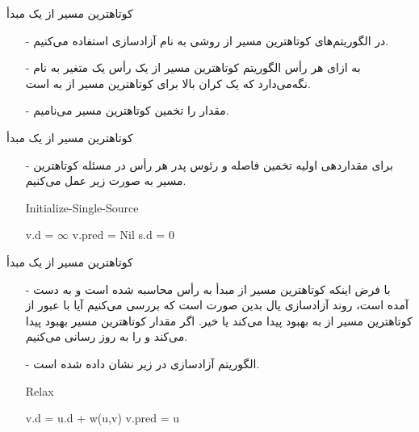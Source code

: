 \begin{frame}{‌کوتاهترین مسیر از یک مبدأ}
\begin{itemize}\itemr
\item[-]
در الگوریتم‌های کوتاهترین مسیر از روشی به نام آزادسازی
استفاده می‌کنیم.
\item[-]
به ازای هر رأس
الگوریتم کوتاهترین مسیر از یک رأس
یک متغیر به نام
نگه‌می‌دارد که یک کران بالا برای کوتاهترین مسیر از
به
است.
\item[-]
مقدار
را تخمین کوتاهترین مسیر
می‌نامیم.
\end{itemize}
\end{frame}


\begin{frame}{‌کوتاهترین مسیر از یک مبدأ}
\begin{itemize}\itemr
\item[-]
برای مقداردهی اولیه تخمین فاصله و رئوس پدر هر رأس در مسئله کوتاهترین مسیر به صورت زیر عمل می‌کنیم.
\begin{algorithm}[H]\alglr
  \caption{Initialize-Single-Source} 
  \begin{algorithmic}[1]
   			\State v.d = $\infty$
   			\State v.pred = Nil
   	\EndFor
   	\State s.d = 0   
  \end{algorithmic}
  \label{alg:merge}
\end{algorithm}
\end{itemize}
\end{frame}


\begin{frame}{‌کوتاهترین مسیر از یک مبدأ}
\begin{itemize}\itemr
\item[-]
با فرض اینکه کوتاهترین مسیر از مبدأ 
 به رأس
محاسبه شده است و 
به دست آمده است،
روند آزادسازی یال
بدین صورت است که بررسی می‌کنیم آیا با عبور از
کوتاهترین مسیر از
به
بهبود پیدا می‌کند یا خیر. اگر مقدار کوتاهترین مسیر بهبود پیدا می‌کند
و
را به روز رسانی می‌کنیم.
\item[-]
الگوریتم آزادسازی در زیر نشان داده شده است.
\begin{algorithm}[H]\alglr
  \caption{Relax} 
  \begin{algorithmic}[1]
   			\State v.d = u.d + w(u,v)
   			\State v.pred = u
   	\EndIf                           
  \end{algorithmic}
  \label{alg:merge}
\end{algorithm}
\end{itemize}
\end{frame}


